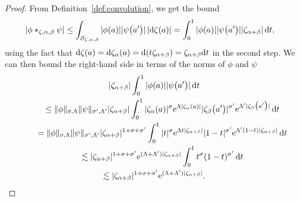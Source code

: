 \documentclass[10pt,a4paper]{amsart}
\numberwithin{equation}{section}
\begin{document}
\begin{proof}
From Definition~\ref{def:convolution}, we get the bound
\begin{align*}
\left|\phi\ast_{\zeta,\alpha,\beta}\psi\right|&\le\int_{\mathcal{S}_{\zeta,\alpha,\beta}} |\phi(a)| |\psi\bigl(a'\bigr)| \,|{\rm d}\zeta(a)| = \int_0^1|\phi(a)| |\psi\bigl(a'\bigr)| |\zeta_{\alpha+\beta}| \,{\rm d}t,
\end{align*}
using the fact that ${\rm d}\zeta(a)={\rm d}\zeta_\alpha(a)={\rm d}(t\zeta_{\alpha+\beta})=\zeta_{\alpha+\beta} {\rm d}t$ in the second step. We can then bound the right-hand side in terms of the norms of $\phi$ and $\psi$
\begin{gather*}
|\zeta_{\alpha+\beta}|\int_0^1 |\phi(a)| |\psi\bigl(a'\bigr)| \,{\rm d}t
\\
\qquad\le \|\phi\|_{\sigma,\Lambda} \|\psi\|_{\sigma',\Lambda'} |\zeta_{\alpha+\beta}|\int_0^1 |\zeta_\alpha(a)|^{\sigma}{\rm e}^{\Lambda |\zeta_{\alpha}(a)|} |\zeta_\beta\bigl(a'\bigr)|^{\sigma'}{\rm e}^{\Lambda' |\zeta_{\beta}\bigl(a'\bigr)|} \,{\rm d}t\\
\qquad= \|\phi\|_{\sigma,\Lambda} \|\psi\|_{\sigma',\Lambda'} |\zeta_{\alpha+\beta}|^{1+\sigma+\sigma'}\int_0^1 |t|^{\sigma}{\rm e}^{\Lambda t |\zeta_{\alpha+\beta}|} |1-t|^{\sigma'}{\rm e}^{\Lambda' (1-t)|\zeta_{\alpha+\beta}|} \,{\rm d}t\\
\qquad\lesssim |\zeta_{\alpha+\beta}| ^{1+\sigma+\sigma'} {\rm e}^{(\Lambda+\Lambda')|\zeta_{\alpha+\beta}|}\int_0^1 t^{\sigma} (1-t)^{\sigma'} \,{\rm d}t\\
\qquad\lesssim |\zeta_{\alpha+\beta}| ^{1+\sigma+\sigma'} {\rm e}^{(\Lambda+\Lambda')|\zeta_{\alpha+\beta}|}.\tag*{\qed}
\end{gather*}\renewcommand{\qed}{}
\end{proof}
\end{document}
